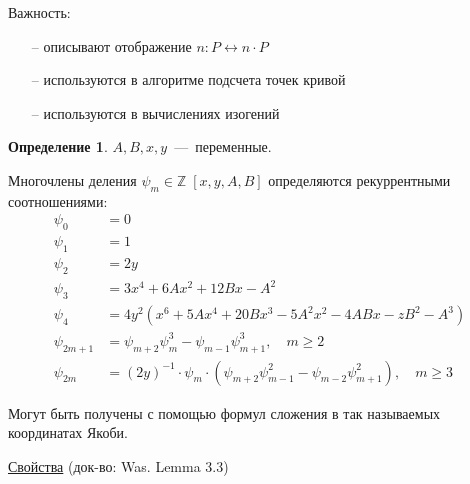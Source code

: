 \documentclass[12pt]{article}
\newcommand{\Z}{{{\mathbb Z}}}
\theoremstyle{definition}
\newtheorem{definition}[theorem]{Определение}
\theoremstyle{definition}
\theoremstyle{definition}
\begin{document}
Важность:
\begin{itemize}
	\item [--] описывают отображение $ n: P \leftrightarrow n \cdot P$
	\item [--] используются в алгоритме подсчета точек кривой
	\item [--] используются в вычислениях изогений
\end{itemize}

\begin{definition}
	\label{def_04}
	$A,B,x,y$~---~переменные.
	
	Многочлены деления ${\psi _m} \in \Z\;\left[ {x,y,A,B} \right]$ определяются рекуррентными соотношениями:
    \begin{align*}
	{\psi _0} &= 0 \\
	{\psi _1} &= 1 \\
	{\psi _2} &= 2y \\
	{\psi _3} &= 3{x^4} + 6A{x^2} + 12Bx - {A^2} \\
	{\psi _4} &= 4{y^2}\left( {{x^6} + 5A{x^4} + 20B{x^3} - 5{A^2}{x^2} - 4ABx - z{B^2} - {A^3}} \right) \\
	{\psi _{2m + 1}} &= {\psi _{m + 2}}\psi _m^3 - {\psi _{m - 1}}\psi _{m + 1}^3, \quad m \geqslant 2 \\
	{\psi _{2m}} &= {\left( {2y} \right)^{ - 1}} \cdot {\psi _m} \cdot \left( {{\psi _{m + 2}}\psi _{m - 1}^2 - {\psi _{m - 2}}\psi _{m + 1}^2} \right),\quad m \geqslant 3
	\end{align*}
\end{definition}

Могут быть получены с помощью формул сложения в так называемых координатах Якоби.

\underline{Свойства} (док-во: Was. Lemma 3.3)
\end{document}
